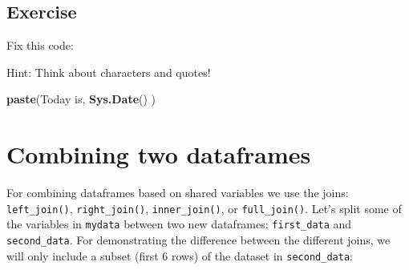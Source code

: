 \documentclass[12pt,]{krantz}
\makeatletter
\newenvironment{Shaded}{\begin{snugshade}}{\end{snugshade}}
\newcommand{\CommentTok}[1]{\textcolor[rgb]{0.56,0.35,0.01}{\textit{#1}}}
\newcommand{\DecValTok}[1]{\textcolor[rgb]{0.00,0.00,0.81}{#1}}
\newcommand{\KeywordTok}[1]{\textcolor[rgb]{0.13,0.29,0.53}{\textbf{#1}}}
\newcommand{\NormalTok}[1]{#1}
\newcommand{\OperatorTok}[1]{\textcolor[rgb]{0.81,0.36,0.00}{\textbf{#1}}}
\newcommand{\StringTok}[1]{\textcolor[rgb]{0.31,0.60,0.02}{#1}}
\newenvironment{kframe}{%
\medskip{}
\setlength{\fboxsep}{.8em}
 \def\at@end@of@kframe{}%
 \ifinner\ifhmode%
  \def\at@end@of@kframe{\end{minipage}}%
  \begin{minipage}{\columnwidth}%
 \fi\fi%
 \def\FrameCommand##1{\hskip\@totalleftmargin \hskip-\fboxsep
 \colorbox{shadecolor}{##1}\hskip-\fboxsep
     \hskip-\linewidth \hskip-\@totalleftmargin \hskip\columnwidth}%
 \MakeFramed {\advance\hsize-\width
   \@totalleftmargin\z@ \linewidth\hsize
   \@setminipage}}%
 {\par\unskip\endMakeFramed%
 \at@end@of@kframe}
\renewenvironment{Shaded}{\begin{kframe}}{\end{kframe}}
\theoremstyle{definition}
\theoremstyle{definition}
\theoremstyle{definition}
\theoremstyle{remark}
\makeatother
\begin{document}
\hypertarget{exercise-7}{%
\subsection{Exercise}\label{exercise-7}}

Fix this code:

Hint: Think about characters and quotes!

\begin{Shaded}
\begin{Highlighting}[]
\KeywordTok{paste}\NormalTok{(Today is, }\KeywordTok{Sys.Date}\NormalTok{() )}
\end{Highlighting}
\end{Shaded}

\hypertarget{combining-two-dataframes}{%
\section{Combining two dataframes}\label{combining-two-dataframes}}

For combining dataframes based on shared variables we use the joins:
\texttt{left\_join()}, \texttt{right\_join()}, \texttt{inner\_join()},
or \texttt{full\_join()}. Let's split some of the variables in
\texttt{mydata} between two new dataframes: \texttt{first\_data} and
\texttt{second\_data}. For demonstrating the difference between the
different joins, we will only include a subset (first 6 rows) of the
dataset in \texttt{second\_data}:

\begin{Shaded}
\end{Shaded}
\end{document}
